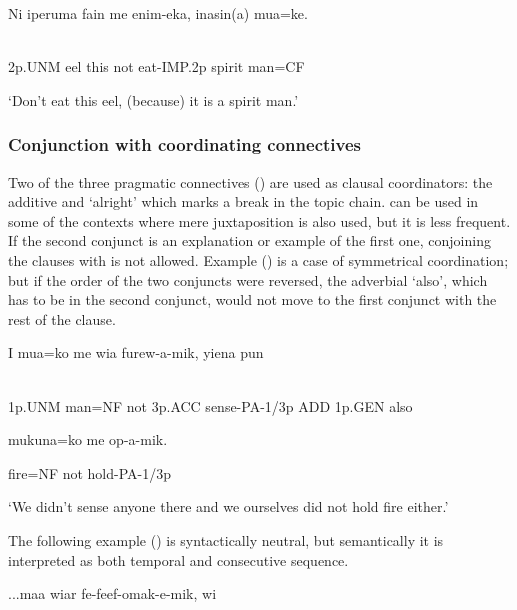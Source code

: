 \ea%
\label{ex:x1425}
\gll Ni  iperuma  fain  me  enim-eka,  inasin(a)  mua=ke. \\
      \\
\glt
\z

2p.UNM  eel  this  not  eat-IMP.2p  spirit  man=CF

`Don't eat this eel, (because) it is a spirit man.'

\subsubsection[Conjunction with coordinating connectives]{Conjunction with coordinating connectives}
\hypertarget{RefHeading22981935131865}{}
Two of the three pragmatic connectives () are used as clausal coordinators: the additive   and  `alright' which marks a break in the topic chain.  can be used in some of the contexts where mere juxtaposition is also used, but it is less frequent. If the second conjunct is an explanation or example of the first one, conjoining the clauses with  is not allowed. Example () is a case of symmetrical coordination; but if the order of the two conjuncts were reversed, the adverbial  `also', which has to be in the second conjunct, would not move to the first conjunct with the rest of the clause.

\ea%
\label{ex:x1372}
\gll I  mua=ko  me  wia  furew-a-mik,    yiena  pun  \\
      \\
\glt
\z

1p.UNM  man=NF  not  3p.ACC  sense-PA-1/3p  ADD  1p.GEN  also

mukuna=ko  me  op-a-mik.

fire=NF  not  hold-PA-1/3p

`We didn't sense anyone there and we ourselves did not hold fire either.'

The following example () is syntactically neutral, but semantically it is interpreted as both temporal and consecutive sequence.

\ea%
\label{ex:x1373}
\gll ...maa  wiar  fe-feef-omak-e-mik,    wi  \\
      \\
\glt
\z

